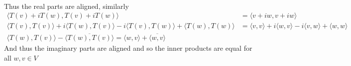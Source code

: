 \documentclass{article}
\begin{document}
\begin{enumerate}
\begin{align*}
             \end{align*}
             Thus the real parts are aligned, similarly
             \begin{align*}
                 \langle T(v) + iT(w), T(v) + iT(w) \rangle &= \langle v + iw, v +iw \rangle\\
                 \langle T(v), T(v) \rangle + i\langle T(w), T(v) \rangle - i\langle T(v), T(w) \rangle + \langle T(w), T(w) \rangle &= \langle v, v \rangle + i \langle w, v \rangle -i \langle v, w \rangle + \langle w, w \rangle\\
                 \langle T(w), T(v) \rangle - \overline{\langle T(w), T(v) \rangle} = \langle w, v \rangle + \overline{ \langle w, v \rangle}
             \end{align*}
             And thus the imaginary parts are aligned and so the inner products are equal for all $w,v \in V$
     \end{enumerate}

    
\end{document}
